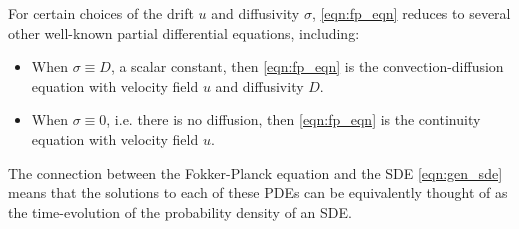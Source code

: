 For certain choices of the drift \(u\) and diffusivity \(\sigma\), \eqref{eqn:fp_eqn} reduces to several other well-known partial differential equations, including:
\begin{itemize}
	\item When \(\sigma \equiv D\), a scalar constant, then \eqref{eqn:fp_eqn} is the convection-diffusion equation with velocity field \(u\) and diffusivity \(D\).
\end{itemize}


\begin{itemize}	\item When \(\sigma \equiv 0\), i.e. there is no diffusion, then \eqref{eqn:fp_eqn} is the continuity equation with velocity field \(u\).
\end{itemize}
The connection between the Fokker-Planck equation and the SDE \eqref{eqn:gen_sde} means that the solutions to each of these PDEs can be equivalently thought of as the time-evolution of the probability density of an SDE.














